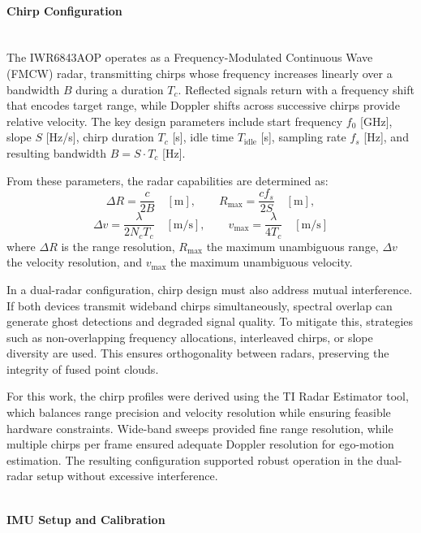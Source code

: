 \paragraph{Chirp Configuration}
\hfill
\\
The IWR6843AOP operates as a Frequency-Modulated Continuous Wave (FMCW) radar, transmitting chirps whose frequency increases linearly over a bandwidth $B$ during a duration $T_c$.  
Reflected signals return with a frequency shift that encodes target range, while Doppler shifts across successive chirps provide relative velocity.  
The key design parameters include start frequency $f_0$ [GHz], slope $S$ [Hz/s], chirp duration $T_c$ [s], idle time $T_{\text{idle}}$ [s], sampling rate $f_s$ [Hz], and resulting bandwidth $B = S \cdot T_c$ [Hz].

From these parameters, the radar capabilities are determined as:
\[
    \Delta R = \frac{c}{2B} \quad [\text{m}], \qquad
    R_{\max} = \frac{c f_s}{2S} \quad [\text{m}],
\]
\[
    \Delta v = \frac{\lambda}{2 N_c T_c} \quad [\text{m/s}], \qquad
    v_{\max} = \frac{\lambda}{4 T_c} \quad [\text{m/s}]
\]
where $\Delta R$ is the range resolution, $R_{\max}$ the maximum unambiguous range, $\Delta v$ the velocity resolution, and $v_{\max}$ the maximum unambiguous velocity.

In a dual-radar configuration, chirp design must also address mutual interference.  
If both devices transmit wideband chirps simultaneously, spectral overlap can generate ghost detections and degraded signal quality.  
To mitigate this, strategies such as non-overlapping frequency allocations, interleaved chirps, or slope diversity are used.  
This ensures orthogonality between radars, preserving the integrity of fused point clouds.

For this work, the chirp profiles were derived using the TI Radar Estimator tool, which balances range precision and velocity resolution while ensuring feasible hardware constraints.  
Wide-band sweeps provided fine range resolution, while multiple chirps per frame ensured adequate Doppler resolution for ego-motion estimation.  
The resulting configuration supported robust operation in the dual-radar setup without excessive interference.


\hfill
\\
\vspace{0.5em}
\noindent\textbf{IMU Setup and Calibration}
\label{sec:imu_setup_calibration}

\setcounter{paragraph}{0} %


